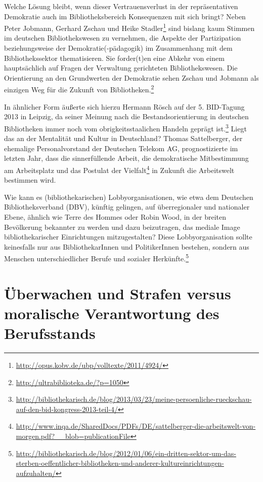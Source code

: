 \documentclass[a4paper,
fontsize=11pt,
oneside,
numbers=noperiodatend,
parskip=half-,
bibliography=totoc,
final
]{scrartcl}
\begin{document}
Welche Lösung bleibt, wenn dieser Vertrauensverlust in der
repräsentativen Demokratie auch im Bibliotheksbereich Konsequenzen mit
sich bringt? Neben Peter Jobmann, Gerhard Zschau und Heike
Stadler\footnote{\url{http://opus.kobv.de/ubp/volltexte/2011/4924/}}
sind bislang kaum Stimmen im deutschen Bibliothekswesen zu vernehmen,
die Aspekte der Partizipation beziehungsweise der Demokratie(-pädagogik)
im Zusammenhang mit dem Bibliothekssektor thematisieren. Sie forder(t)en
eine Abkehr von einem haupt\-säch\-lich auf Fragen der Verwaltung
gerichteten Bibliothekswesen. Die Orientierung an den Grundwerten der
Demokratie sehen Zschau und Jobmann als einzigen Weg für die Zukunft von
Bibliotheken.\footnote{\url{http://ultrabiblioteka.de/?p=1050}}

In ähnlicher Form äußerte sich hierzu Hermann Rösch auf der 5.
BID-Tagung 2013 in Leipzig, da seiner Meinung nach die
Bestandsorientierung in deutschen Bibliotheken immer noch vom
obrigkeitsstaalichen Handeln geprägt ist.\footnote{\url{http://bibliothekarisch.de/blog/2013/03/23/meine-persoenliche-rueckschau-auf-den-bid-kongress-2013-teil-4/}}
Liegt das an der Mentalität und Kultur in Deutschland? Thomas
Sattelberger, der ehemalige Personalvorstand der Deutschen Telekom AG,
prognostizierte im letzten Jahr, dass die sinnerfüllende Arbeit, die
demokratische Mitbestimmung am Arbeitsplatz und das Postulat der
Vielfalt\footnote{\url{http://www.inqa.de/SharedDocs/PDFs/DE/sattelberger-die-arbeitswelt-von-morgen.pdf?\_\_blob=publicationFile}}
in Zukunft die Arbeitswelt bestimmen wird.

Wie kann es (bibliothekarischen) Lobbyorganisationen, wie etwa dem
Deutschen Bibliotheksverband (DBV), künftig gelingen, auf überregionaler
und nationaler Ebene, ähnlich wie Terre des Hommes oder Robin Wood, in
der breiten Bevölkerung bekannter zu werden und dazu beizutragen, das
mediale Image bibliothekarischer Einrichtungen mitzugestalten? Diese
Lobbyorganisation sollte keinesfalls nur aus BibliothekarInnen und
PolitikerInnen bestehen, sondern aus Menschen unterschiedlicher Berufe
und sozialer Herkünfte.\footnote{\url{http://bibliothekarisch.de/blog/2012/01/06/ein-dritten-sektor-um-das-sterben-oeffentlicher-bibliotheken-und-anderer-kultureinrichtungen-aufzuhalten/}}

\section{Überwachen und Strafen versus moralische Verantwortung
des
Berufsstands}\label{uxfcberwachen-und-strafen-versus-moralische-verantwortung-des-berufsstands}
\end{document}
